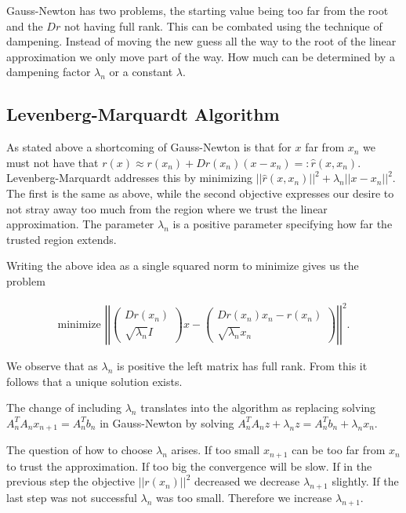Gauss-Newton has two problems, the starting value being too far from the root and the $Dr$ not having full rank. This can be combated using the technique of dampening. Instead of moving the new guess all the way to the root of the linear approximation we only move part of the way. How much can be determined by a dampening factor $\lambda_n$ or a constant $\lambda$.

\subsection{Levenberg-Marquardt Algorithm}

As stated above a shortcoming of Gauss-Newton is that for $x$ far from $x_n$ we must not have that $r(x) \approx r(x_n) + Dr(x_n)(x-x_n) =: \hat{r}(x, x_n)$. Levenberg-Marquardt addresses this by minimizing $||\hat{r}(x, x_n)||^2 + \lambda_n ||x-x_n||^2$. The first is the same as above, while the second objective expresses our desire to not stray away too much from the region where we trust the linear approximation. The parameter $\lambda_n$ is a positive parameter specifying how far the trusted region extends.

Writing the above idea as a single squared norm to minimize gives us the problem

\begin{align*}
	\text{minimize }
	\left|\left|\left(\begin{matrix}
		Dr(x_n)\\ \sqrt{\lambda_n}I
	\end{matrix}\right) x - \left(\begin{matrix}
		Dr(x_n)x_n - r(x_n)\\ \sqrt{\lambda_n} x_n
	\end{matrix}\right)\right|\right|^2.
\end{align*}

We observe that as $\lambda_n$ is positive the left matrix has full rank. From this it follows that a unique solution exists.

The change of including $\lambda_n$ translates into the algorithm as replacing solving $A_n^TA_nx_{n+1} = A_n^Tb_n$ in Gauss-Newton by solving $A_n^T A_n z + \lambda_n z= A_n^T b_n + \lambda_n x_n$.

The question of how to choose $\lambda_n$ arises. If too small $x_{n+1}$ can be too far from $x_n$ to trust the approximation. If too big the convergence will be slow. If in the previous step the objective $||r(x_n)||^2$ decreased we decrease $\lambda_{n+1}$ slightly. If the last step was not successful $\lambda_n$ was too small. Therefore we increase $\lambda_{n+1}$.

